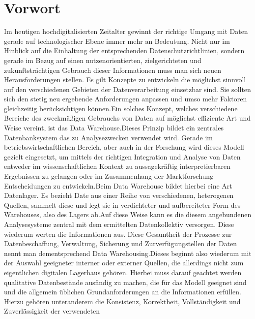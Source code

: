 \documentclass[sigconf]{acmart}
\begin{document}


\maketitle



\section{Vorwort}
Im heutigen hochdigitalisierten Zeitalter gewinnt der richtige Umgang mit Daten gerade auf technologischer Ebene immer mehr an Bedeutung. Nicht nur im Hinblick auf die Einhaltung der entsprechenden Datenschutzrichtlinien, sondern gerade im Bezug auf einen nutzenorientierten, zielgerichteten und zukunftsträchtigen Gebrauch dieser Informationen muss man sich neuen Herausforderungen stellen. Es gilt Konzepte zu entwickeln die möglichst sinnvoll auf den verschiedenen Gebieten der Datenverarbeitung einsetzbar sind. Sie sollten sich den stetig neu ergebende Anforderungen anpassen und umso mehr Faktoren gleichzeitig berücksichtigen können.\newline Ein solches Konzept, welches verschiedene Bereiche des zweckmäßigen Gebrauchs von Daten auf möglichst effiziente Art und Weise vereint, ist das Data Warehouse.\newline Dieses Prinzip bildet ein zentrales Datenbanksystem das zu Analysezwecken verwendet wird. Gerade im betriebswirtschaftlichen Bereich, aber auch in der Forschung wird dieses Modell gezielt eingesetzt, um mittels der richtigen Integration und Analyse von Daten entweder im wissenschaftlichen Kontext zu aussagekräftig interpretierbaren Ergebnissen zu gelangen oder im Zusammenhang der Marktforschung Entscheidungen zu entwickeln.\newline Beim Data Warehouse bildet hierbei eine Art Datenlager. Es bezieht  Date aus einer Reihe von verschiedenen, heterogenen Quellen, sammelt diese und legt sie in verdichteter und aufbereiteter Form des Warehouses, also des Lagers ab.\newline Auf diese Weise kann es die diesem angebundenen Analysesysteme zentral mit dem ermittelten Datenkollektiv versorgen. Diese wiederum werten die Informationen aus. Diese Gesamtheit der Prozesse zur Datenbeschaffung, Verwaltung, Sicherung und Zurverfügungstellen der Daten nennt man dementsprechend Data Warehousing.\newline Dieses beginnt also wiederum mit der Auswahl geeigneter interner oder externer Quellen, die allerdings nicht zum eigentlichen digitalen Lagerhaus gehören. Hierbei muss darauf geachtet werden qualitative Datenbestände ausfindig zu machen, die für das Modell geeignet sind und die allgemein üblichen Grundanforderungen an die Informationen erfüllen. Hierzu gehören unteranderem die Konsistenz, Korrektheit, Vollständigkeit und Zuverlässigkeit der verwendeten 
\end{document}
